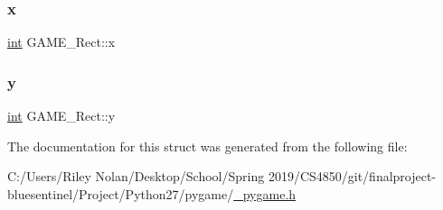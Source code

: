 \mbox{\label{struct_g_a_m_e___rect_a23ec041bc338ec0798414b9558592b55}} 
\subsubsection{\texorpdfstring{x}{x}}
{\footnotesize\ttfamily \mbox{\hyperlink{warnings_8h_a74f207b5aa4ba51c3a2ad59b219a423b}{int}} G\+A\+M\+E\+\_\+\+Rect\+::x}

\mbox{\label{struct_g_a_m_e___rect_aefd438e3954fa6a8c4205bde866e96f0}} 
\subsubsection{\texorpdfstring{y}{y}}
{\footnotesize\ttfamily \mbox{\hyperlink{warnings_8h_a74f207b5aa4ba51c3a2ad59b219a423b}{int}} G\+A\+M\+E\+\_\+\+Rect\+::y}



The documentation for this struct was generated from the following file\+:\begin{DoxyCompactItemize}
\item 
C\+:/\+Users/\+Riley Nolan/\+Desktop/\+School/\+Spring 2019/\+C\+S4850/git/finalproject-\/bluesentinel/\+Project/\+Python27/pygame/\mbox{\hyperlink{__pygame_8h}{\+\_\+pygame.\+h}}\end{DoxyCompactItemize}
